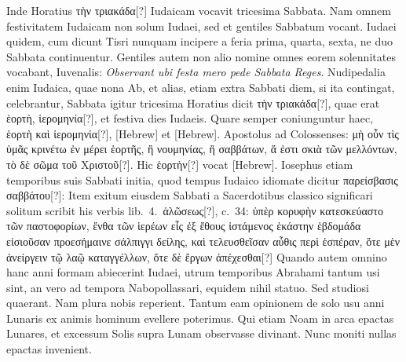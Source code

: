 Inde Horatius \textgreek{τὴν τριακάδα}[?] Iudaicam
vocavit tricesima Sabbata.
Nam omnem festivitatem Iudaicam
non solum Iudaei, sed et gentiles Sabbatum vocant.
Iudaei
quidem, cum dicunt Tisri nunquam incipere a feria prima,
quarta, sexta, ne duo Sabbata continuentur.
Gentiles autem
non alio nomine omnes eorem solennitates vocabant, Iuvenalis:
\textit{Observant ubi festa mero pede Sabbata Reges}.
Nudipedalia
enim Iudaica, quae nona Ab, et alias, etiam extra
Sabbati diem, si ita contingat, celebrantur, Sabbata igitur tricesima
Horatius dicit \textgreek{τὴν τριακάδα}[?],
 quae erat \textgreek{ἑορτὴ, ἱερομηνία}[?], et
festiva dies Iudaeis.
Quare semper coniunguntur haec, \textgreek{ἑορτὴ καὶ ἱερομηνία}[?],
\texthebrew{}[Hebrew] et \texthebrew{}[Hebrew].
%
Apostolus ad Colossenses:
 \textgreek{μὴ οὖν τὶς ὑμᾶς κρινέτω ἐν μέρει
ἑορτῆς, ἢ νουμηνίας, ἢ σαββάτων, ἅ ἐστι σκιὰ τῶν μελλόντων, τὸ δὲ σῶμα τοῦ
Χριστοῦ}[?].
Hic \textgreek{ἑορτὴν}[?] vocat \texthebrew{}[Hebrew].
Iosephus etiam temporibus suis Sabbati
initia, quod tempus Iudaico idiomate dicitur
 \textgreek{παρείσβασις σαββάτου}[?]:
Item exitum eiusdem Sabbati a Sacerdotibus classico significari
solitum scribit his verbis lib.\ 4.\ \textgreek{ἁλῶσεως}[?], c.\ 34:
 \textgreek{ὑπὲρ κορυφὴν κατεσκεύαστο
τῶν παστοφορίων, ἔνθα τῶν ἱερέων εἷς ἐξ ἔθους ἱστάμενος ἑκάστην ἑβδομάδα
εἰσιοῦσαν προεσήμαινε σάλπιγγι δείλης, καὶ τελευσθεῖσαν αὖθις περὶ ἑσπέραν,
ὅτε μὲν ἀνείργειν τῷ λαῷ καταγγέλλων, ὅτε δὲ ἔργων ἀπέχεσθαι}[?]
Quando
autem omnino hanc anni formam abiecerint Iudaei, utrum temporibus
Abrahami tantum usi sint, an vero ad tempora Nabopollassari,
equidem nihil statuo.
Sed studiosi quaerant.
Nam plura nobis
reperient.
Tantum eam opinionem de solo usu anni Lunaris ex animis
hominum evellere poterimus.
Qui etiam Noam in arca epactas
Lunares, et excessum Solis supra Lunam observasse divinant.
Nunc
moniti nullas epactas invenient.
%
